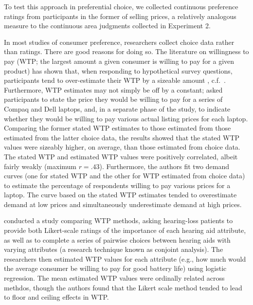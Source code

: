 To test this approach in preferential choice, we collected continuous preference ratings from participants in the former of selling prices, a relatively analogous measure to the continuous area judgments collected in Experiment 2. 

In most studies of consumer preference, researchers collect choice data rather than ratings. There are good reasons for doing so. The literature on willingness to pay (WTP; the largest amount a given consumer is willing to pay for a given product) has shown that, when responding to hypothetical survey questions, participants tend to over-estimate their WTP by a sizeable amount \parencite{breidertREVIEWMETHODSMEASURING2006,schmidtAccuratelyMeasuringWillingness2020}, c.f.~\textcite{miller2011should}. Furthermore, WTP estimates may not simply be off by a constant; \textcite{jedidi2002augmenting} asked participants to state the price they would be willing to pay for a series of Compaq and Dell laptops, and, in a separate phase of the study, to indicate whether they would be willing to pay various actual listing prices for each laptop. Comparing the former stated WTP estimates to those estimated from those estimated from the latter choice data, the results showed that the stated WTP values were sizeably higher, on average, than those estimated from choice data. The stated WTP and estimated WTP values were positively correlated, albeit fairly weakly (maximum $r=.43$). Furthermore, the authors fit two demand curves (one for stated WTP and the other for WTP estimated from choice data) to estimate the percentage of respondents willing to pay various prices for a laptop. The curve based on the stated WTP estimates tended to overestimate demand at low prices and simultaneously underestimate demand at high prices.

\textcite{bridges2012consumer} conducted a study comparing WTP methods, asking hearing-loss patients to provide both Likert-scale ratings of the importance of each hearing aid attribute, as well as to complete a series of pairwise choices between hearing aids with varying attributes (a research technique known as conjoint analysis). The researchers then estimated WTP values for each attribute (e.g., how much would the average consumer be willing to pay for good battery life) using logistic regression. The mean estimated WTP values were ordinally related across methdos, though the authors found that the Likert scale method tended to lead to floor and ceiling effects in WTP. 


